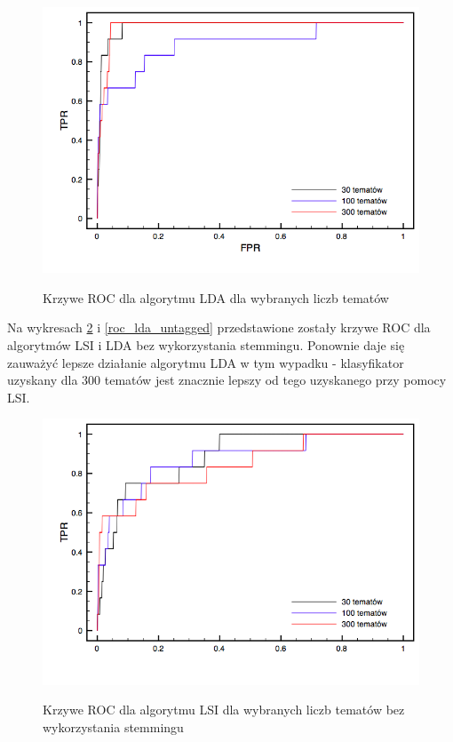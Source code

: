 \documentclass[11pt,a4paper]{article}
\begin{document}
\begin{figure}[h]
\caption{Krzywe ROC dla algorytmu LDA dla wybranych liczb tematów}
\includegraphics[width=\linewidth]{gfx/lda_roc.png}
\label{roc_lda}
\end{figure}

Na wykresach \ref{roc_lsi_untagged} i \ref{roc_lda_untagged} przedstawione
zostały krzywe ROC dla algorytmów LSI i LDA bez wykorzystania stemmingu.
Ponownie daje się zauważyć lepsze działanie algorytmu LDA w tym wypadku -
klasyfikator uzyskany dla 300 tematów jest znacznie lepszy od tego uzyskanego
przy pomocy LSI.

\begin{figure}[h]
\caption{Krzywe ROC dla algorytmu LSI dla wybranych liczb tematów bez wykorzystania stemmingu}
\includegraphics[width=\linewidth]{gfx/lsi_roc_untagged.png}
\label{roc_lsi_untagged}
\end{figure}
\end{document}
